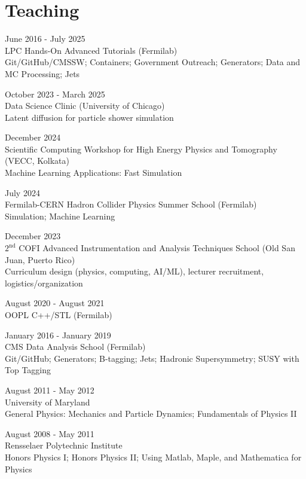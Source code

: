 \section{Teaching}
\begin{description}[leftmargin=12pt,font=\normalfont\textit]
\item[Facilitator] \hfill June 2016 - July 2025\\
LPC Hands-On Advanced Tutorials (Fermilab)\\
Git/GitHub/CMSSW; Containers; Government Outreach; Generators; Data and MC Processing; Jets
\item[Project Advisor] \hfill October 2023 - March 2025\\
Data Science Clinic (University of Chicago)\\
Latent diffusion for particle shower simulation
\item[Lecturer] \hfill December 2024\\
Scientific Computing Workshop for High Energy Physics and Tomography (VECC, Kolkata)\\
Machine Learning Applications: Fast Simulation
\item[Lecturer] \hfill July 2024\\
Fermilab-CERN Hadron Collider Physics Summer School (Fermilab)\\
Simulation; Machine Learning
\item[Co-director] \hfill December 2023\\
$2^{\text{nd}}$ COFI Advanced Instrumentation and Analysis Techniques School (Old San Juan, Puerto Rico)\\
Curriculum design (physics, computing, AI/ML), lecturer recruitment, logistics/organization
\item[Teaching Assistant] \hfill August 2020 - August 2021\\
OOPL C++/STL (Fermilab)
\item[Facilitator] \hfill January 2016 - January 2019\\
CMS Data Analysis School (Fermilab)\\
Git/GitHub; Generators; B-tagging; Jets; Hadronic Supersymmetry; SUSY with Top Tagging
\item[Graduate Teaching Assistant] \hfill August 2011 - May 2012\\
University of Maryland\\
General Physics: Mechanics and Particle Dynamics; Fundamentals of Physics II
\item[Undergraduate Teaching Assistant] \hfill August 2008 - May 2011\\
Rensselaer Polytechnic Institute\\
Honors Physics I; Honors Physics II; Using Matlab, Maple, and Mathematica for Physics
\end{description}
